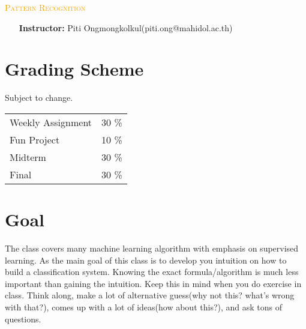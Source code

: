 \documentclass[a4paper, 12pt]{article}
\begin{document}
\begin{center}
	\textcolor{orange}{\Huge{\textsc{Pattern Recognition}}}\\
\end{center}

\begin{itemize}[leftmargin=1in]
\item [\textcolor{cobalt}{\textbf{Instructor:}}] Piti Ongmongkolkul(piti.ong@mahidol.ac.th)

\end{itemize}

\section*{Grading Scheme}

Subject to change.

\begin{center}
\setlength{\arrayrulewidth}{2pt} 
\begin{tabular}{lr}

\arrayrulecolor{cobalt}\hline
Weekly Assignment \hspace{2cm} & 30 \% \\

Fun Project & 10 \% \\

Midterm \hspace{2cm} & 30 \% \\

Final \hspace{2cm} & 30 \% \\
\hline
\end{tabular}
\end{center}

\section*{Goal}

 The class covers many machine learning algorithm with emphasis on supervised learning. As the main goal of this class is to develop you intuition on how to build a classification system. Knowing the exact formula/algorithm is much less important than gaining the intuition. Keep this in mind when you do exercise in class. Think along, make a lot of alternative guess(why not this? what's wrong with that?), comes up with a lot of ideas(how about this?), and ask tons of questions.
\end{document}
